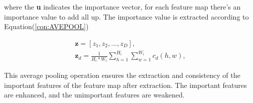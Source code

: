 where the \textbf{u} indicates the importance vector, for each feature map there's an importance value to add all up. The importance value is extracted according to Equation(\ref{con:AVEPOOL}) \cite{huang2021fapn}

\begin{equation}
    \begin{aligned}
    \textbf{z}= [z_1, z_2, ..., z_D],\\
    \textbf{z}_d = \frac{1}{H_i * W_i}\sum_{h = 1}^{H_i}\sum_{w = 1}^{W_i}c_d(h,w),
    \label{con:AVEPOOL}
    \end{aligned}
\end{equation}

This average pooling operation ensures the extraction and consistency of the important features of the feature map after extraction. The important features are enhanced, and the unimportant features are weakened.


\clearpage